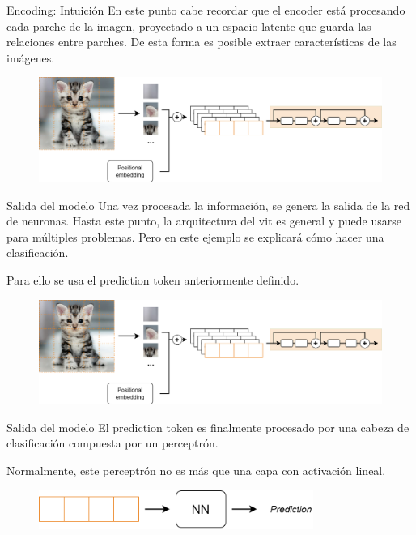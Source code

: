 \begin{frame}{Encoding: Intuición}
En este punto cabe recordar que el \alert{encoder} está procesando cada parche de la imagen, \alert{proyectado} a un espacio latente que guarda las \alert{relaciones entre parches}. De esta forma es posible \alert{extraer características} de las imágenes.

\begin{figure}
    \centering
    \includegraphics[width=\textwidth]{Slides/figures/Vision_Transformers/Encoding_Processing.png}
\end{figure}
\end{frame}

\begin{frame}{Salida del modelo}
Una vez procesada la información, se genera la \alert{salida} de la red de neuronas. Hasta este punto, la arquitectura del \gls{vit} es general y puede usarse para múltiples problemas. Pero en este ejemplo se explicará cómo hacer una \alert{clasificación}.

Para ello se usa el \alert{prediction token} anteriormente definido.

\begin{figure}
    \centering
    \includegraphics[width=\textwidth]{Slides/figures/Vision_Transformers/Encoding_Processing.png}
\end{figure}
\end{frame}

\begin{frame}{Salida del modelo}
El prediction token es finalmente procesado por una \alert{cabeza de clasificación} compuesta por un \alert{perceptrón}.

Normalmente, este perceptrón no es más que una capa con activación lineal.

\begin{figure}
    \centering
    \includegraphics[width=0.8\textwidth]{Slides/figures/Vision_Transformers/Output.png}
\end{figure}
\end{frame}

